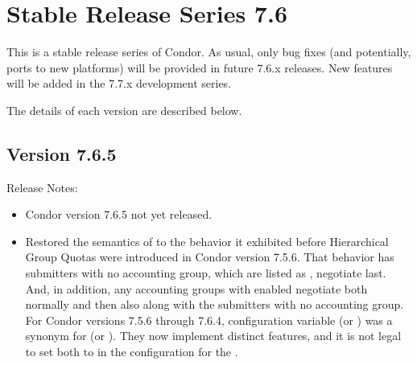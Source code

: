 
\section{\label{sec:History-7-6}Stable Release Series 7.6}

This is a stable release series of Condor.
As usual, only bug fixes (and potentially, ports to new platforms)
will be provided in future 7.6.x releases.
New features will be added in the 7.7.x development series.

The details of each version are described below.

\subsection*{\label{sec:New-7-6-5}Version 7.6.5}

\noindent Release Notes:

\begin{itemize}

\item Condor version 7.6.5 not yet released.

\item Restored the semantics of  to the
behavior it exhibited before Hierarchical Group Quotas were introduced
in Condor version 7.5.6.
That behavior has submitters with no accounting group,
which are listed as , negotiate last.
And, in addition, any accounting groups with 
enabled negotiate both normally and then also along with the 
submitters with no accounting group.
For Condor versions 7.5.6 through 7.6.4, configuration variable
 (or )
was a synonym for 
(or ).
They now implement distinct features,
and it is not legal to set both to  in the configuration
for the .

\end{itemize}


